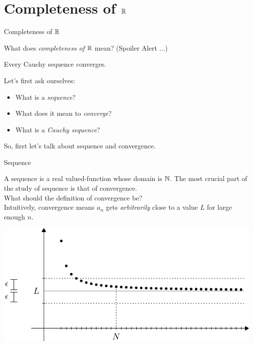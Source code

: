 \documentclass{beamer}
\begin{document}
\section{Completeness of $\R$}
\begin{frame}[plain]
  \begin{center}
    {\huge\color{blue} Completeness of $\R$}
  \end{center}
\end{frame}
\begin{frame}
  What does \emph{completeness of $\R$} mean?
  \pause
  (Spoiler Alert ...) 
  \begin{theorem}[Completeness of $\R$]
    \pause Every Cauchy sequence converges.
  \end{theorem}
  \pause
  Let's first ask ourselves: \pause
  \begin{itemize}
    \item What is a \emph{sequence}?\pause
    \item What does it mean to \emph{converge}?\pause
    \item What is a \emph{Cauchy sequence}?\pause
  \end{itemize}

  So, first let's talk about sequence and convergence.

\end{frame}
\begin{frame}{Sequence}

  A sequence is a real valued-function whose domain is $\N$.
  The most crucial part of the study of sequence is that of 
  convergence.\\[0.3cm]
  \pause
  What should the definition of convergence be?\\[0.3cm]
  \pause
  Intuitively, convergence means $a_n$ gets 
  \emph{arbitrarily} close to a value $L$ for large enough $n$.
  \\[0.3cm]\pause

  \begin{center}
    \includegraphics[scale=0.8]{converge.pdf}
  \end{center}

\end{frame}
\end{document}
